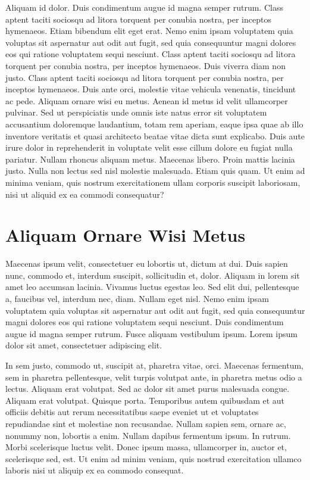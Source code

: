 Aliquam id dolor. Duis condimentum augue id magna semper rutrum. Class aptent taciti sociosqu ad litora torquent per conubia nostra, per inceptos hymenaeos. Etiam bibendum elit eget erat. Nemo enim ipsam voluptatem quia voluptas sit aspernatur aut odit aut fugit, sed quia consequuntur magni dolores eos qui ratione voluptatem sequi nesciunt. Class aptent taciti sociosqu ad litora torquent per conubia nostra, per inceptos hymenaeos. Duis viverra diam non justo. Class aptent taciti sociosqu ad litora torquent per conubia nostra, per inceptos hymenaeos. Duis ante orci, molestie vitae vehicula venenatis, tincidunt ac pede. Aliquam ornare wisi eu metus. Aenean id metus id velit ullamcorper pulvinar. Sed ut perspiciatis unde omnis iste natus error sit voluptatem accusantium doloremque laudantium, totam rem aperiam, eaque ipsa quae ab illo inventore veritatis et quasi architecto beatae vitae dicta sunt explicabo. Duis aute irure dolor in reprehenderit in voluptate velit esse cillum dolore eu fugiat nulla pariatur. Nullam rhoncus aliquam metus. Maecenas libero. Proin mattis lacinia justo. Nulla non lectus sed nisl molestie malesuada. Etiam quis quam. Ut enim ad minima veniam, quis nostrum exercitationem ullam corporis suscipit laboriosam, nisi ut aliquid ex ea commodi consequatur?

\section{Aliquam Ornare Wisi Metus}
Maecenas ipsum velit, consectetuer eu lobortis ut, dictum at dui. Duis sapien nunc, commodo et, interdum suscipit, sollicitudin et, dolor. Aliquam in lorem sit amet leo accumsan lacinia. Vivamus luctus egestas leo. Sed elit dui, pellentesque a, faucibus vel, interdum nec, diam. Nullam eget nisl. Nemo enim ipsam voluptatem quia voluptas sit aspernatur aut odit aut fugit, sed quia consequuntur magni dolores eos qui ratione voluptatem sequi nesciunt. Duis condimentum augue id magna semper rutrum. Fusce aliquam vestibulum ipsum. Lorem ipsum dolor sit amet, consectetuer adipiscing elit.

In sem justo, commodo ut, suscipit at, pharetra vitae, orci. Maecenas fermentum, sem in pharetra pellentesque, velit turpis volutpat ante, in pharetra metus odio a lectus. Aliquam erat volutpat. Sed ac dolor sit amet purus malesuada congue. Aliquam erat volutpat. Quisque porta. Temporibus autem quibusdam et aut officiis debitis aut rerum necessitatibus saepe eveniet ut et voluptates repudiandae sint et molestiae non recusandae. Nullam sapien sem, ornare ac, nonummy non, lobortis a enim. Nullam dapibus fermentum ipsum. In rutrum. Morbi scelerisque luctus velit. Donec ipsum massa, ullamcorper in, auctor et, scelerisque sed, est. Ut enim ad minim veniam, quis nostrud exercitation ullamco laboris nisi ut aliquip ex ea commodo consequat.
\endinput